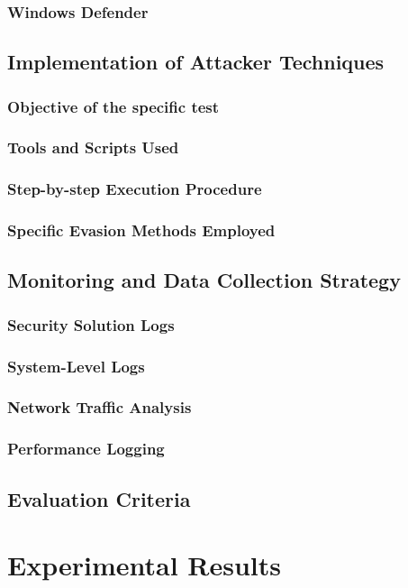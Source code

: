 \documentclass[11pt]{article}
\begin{document}
				\subsubsection{Windows Defender}
			\subsection{Implementation of Attacker Techniques}
				\subsubsection{Objective of the specific test}
				\subsubsection{Tools and Scripts Used}
				\subsubsection{Step-by-step Execution Procedure}
				\subsubsection{Specific Evasion Methods Employed}
			\subsection{Monitoring and Data Collection Strategy}
				\subsubsection{Security Solution Logs}
				\subsubsection{System-Level Logs}
				\subsubsection{Network Traffic Analysis}
				\subsubsection{Performance Logging}
			\subsection{Evaluation Criteria}

		\section{Experimental Results}
\end{document}
